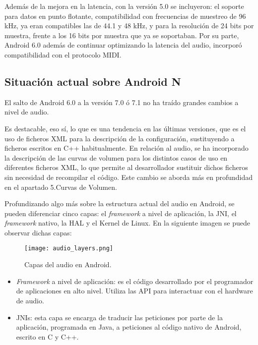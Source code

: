 Además de la mejora en la latencia, con la versión 5.0 se incluyeron: el soporte para datos en punto flotante, compatibilidad con frecuencias de muestreo de 96 kHz, ya eran compatibles las de 44.1 y 48 kHz, y para la resolución de 24 bits por muestra, frente a los 16 bits por muestra que ya se soportaban.
Por su parte, Android 6.0 además de continuar optimizando la latencia del audio, incorporó compatibilidad con el protocolo \gls{MIDI}.


\subsection{Situación actual sobre Android N}
El salto de Android 6.0 a la versión 7.0 ó 7.1 no ha traído grandes cambios a nivel de audio.

Es destacable, eso sí, lo que es una tendencia en las últimas versiones, que es el uso de ficheros XML para la descripción de la configuración, sustituyendo a ficheros escritos en C++ habitualmente. En relación al audio, se ha incorporado la descripción de las curvas de volumen para los distintos casos de uso en diferentes ficheros XML, lo que permite al desarrollador sustituir dichos ficheros sin necesidad de recompilar el código. Este cambio se aborda más en profundidad en el apartado 5.Curvas de Volumen. %

Profundizando algo más sobre la estructura actual del audio en Android, se pueden diferenciar cinco capas: el \textit{framework} a nivel de aplicación, la \gls{JNI}, el \textit{framework} nativo, la \gls{HAL} y el Kernel de Linux. En la siguiente imagen se puede observar dichas capas:

\begin{wrapfigure}{l}{0.47\textwidth}
	\centering
	\texttt{[image: audio\_layers.png]}
	\caption[Capas del audio en Android]{Capas del audio en Android.}
	\label{fig:audio_layers}
\end{wrapfigure}

\hfill

\begin{itemize}
	\item{\textit{Framework} a nivel de aplicación: es el código desarrollado por el programador de aplicaciones en alto nivel. Utiliza las \gls{API} para interactuar con el hardware de audio.}	
	\item{\glspl{JNI}: esta capa se encarga de traducir las peticiones por parte de la aplicación, programada en Java, a peticiones al código nativo de Android, escrito en C y C++.}
\end{itemize}

